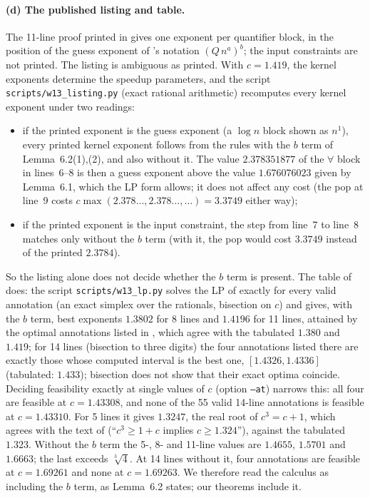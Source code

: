 \documentclass[11pt]{article}
\theoremstyle{definition}
\newcommand{\cbrt}{\sqrt[3]{4}}
\begin{document}
\paragraph{(d) The published listing and table.}
The 11-line proof printed in \cite[\S6.2]{W13} gives one exponent per quantifier block, in the position of the guess exponent of \cite{W13}'s notation $(Q\,n^{a})^{b}$; the input constraints are not printed. The listing is ambiguous as printed. With $c=1.419$, the kernel exponents determine the speedup parameters, and the script \texttt{scripts/w13\_listing.py} (exact rational arithmetic) recomputes every kernel exponent under two readings:
\begin{itemize}
\item if the printed exponent is the guess exponent (a $\log n$ block shown as $n^1$), every printed kernel exponent follows from the rules with the $b$ term of Lemma~6.2(1),(2), and also without it. The value $2.378351877$ of the $\forall$ block in lines~6--8 is then a guess exponent above the value $1.676076023$ given by Lemma~6.1, which the LP form allows; it does not affect any cost (the pop at line~9 costs $c\max(2.378\ldots,2.378\ldots,\dots)=3.3749$ either way);
\item if the printed exponent is the input constraint, the step from line~7 to line~8 matches only without the $b$ term (with it, the pop would cost $3.3749$ instead of the printed $2.3784$).
\end{itemize}
So the listing alone does not decide whether the $b$ term is present. The table of \cite[\S6.2]{W13} does: the script \texttt{scripts/w13\_lp.py} solves the LP of \cite[\S6.1]{W13} exactly for every valid annotation (an exact simplex over the rationals, bisection on $c$) and gives, with the $b$ term, best exponents $1.3802$ for 8 lines and $1.4196$ for 11 lines, attained by the optimal annotations listed in \cite{W13}, which agree with the tabulated $1.380$ and $1.419$; for 14 lines (bisection to three digits) the four annotations listed there are exactly those whose computed interval is the best one, $[1.4326,1.4336]$ (tabulated: $1.433$); bisection does not show that their exact optima coincide. Deciding feasibility exactly at single values of $c$ (option \texttt{--at}) narrows this: all four are feasible at $c=1.43308$, and none of the 55 valid 14-line annotations is feasible at $c=1.43310$. For 5 lines it gives $1.3247$, the real root of $c^3=c+1$, which agrees with the text of \cite[p.~A:27]{W13} (``$c^3\ge 1+c$ implies $c\ge1.324$''), against the tabulated $1.323$. Without the $b$ term the 5-, 8- and 11-line values are $1.4655$, $1.5701$ and $1.6663$; the last exceeds $\cbrt$. At 14 lines without it, four annotations are feasible at $c=1.69261$ and none at $c=1.69263$. We therefore read the calculus as including the $b$ term, as Lemma~6.2 states; our theorems include it.
\end{document}
